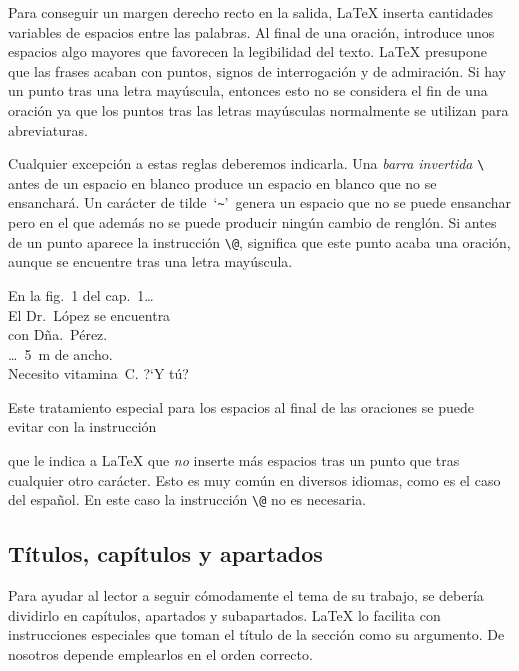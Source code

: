 Para conseguir un margen derecho  recto en la salida, \LaTeX{} inserta
cantidades variables de  espacios entre las palabras. Al  final de una
oración,  introduce  unos  espacios  algo  mayores  que  favorecen  la
legibilidad del  texto. \LaTeX{} presupone  que las frases  acaban con
puntos, signos de interrogación y de  admiración. Si hay un punto tras
una  letra mayúscula,  entonces esto  no se  considera el  fin de  una
oración ya  que los puntos  tras las letras mayúsculas  normalmente se
utilizan para abreviaturas.

Cualquier   excepción  a   estas  reglas   deberemos  indicarla.   Una
\emph{barra  invertida}  \verb|\|  antes   de  un  espacio  en  blanco
produce  un  espacio en  blanco  que  no  se ensanchará.  Un  carácter
de  tilde~`\verb|~|'\ genera  un  espacio que  no  se puede  ensanchar
pero  en  el  que  además  no  se  puede  producir  ningún  cambio  de
renglón.  Si  antes de  un  punto  aparece la  instrucción  \verb|\@|,
significa  que  este punto  acaba  una  oración, aunque  se  encuentre
tras   una   letra   mayúscula.      
 

\begin{example}
En la fig.\ 1 del cap.\ 1\dots \\
El Dr.~López se encuentra \\
con Dña.~Pérez. \\
\dots\ 5~m de ancho. \\
Necesito vitamina~C\@. ?`Y tú?
\end{example}

Este tratamiento especial para los  espacios al final de las oraciones
se puede evitar con la instrucción

\begin{command}
\end{command}

\noindent que le indica a  \LaTeX{} que \emph{no} inserte más espacios
tras un punto  que tras cualquier otro carácter. Esto  es muy común en
diversos  idiomas, como  es  el  caso del  español.  En  este caso  la
instrucción \verb|\@| no es necesaria.

    
\subsection{Títulos, capítulos y apartados}

Para ayudar al  lector a seguir cómodamente el tema  de su trabajo, se
debería dividirlo en capítulos,  apartados y subapartados. \LaTeX{} lo
facilita  con  instrucciones especiales  que  toman  el título  de  la
sección como su argumento. De  nosotros depende emplearlos en el orden
correcto.

